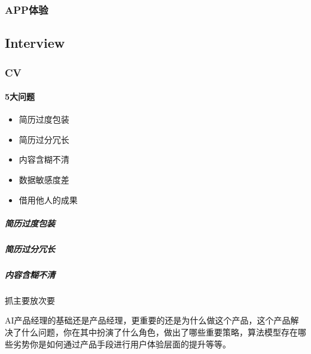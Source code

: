 \documentclass[letterpaper,11pt,english]{sphinxmanual}
\begin{document}
\subsubsection{APP体验}
\label{\detokenize{chapter_project/APP_experience:app}}\label{\detokenize{chapter_project/APP_experience::doc}}

\subsection{Interview}
\label{\detokenize{chapter_interview/index:interview}}\label{\detokenize{chapter_interview/index:chap-interview}}\label{\detokenize{chapter_interview/index::doc}}

\subsubsection{CV}
\label{\detokenize{chapter_interview/CV:cv}}\label{\detokenize{chapter_interview/CV::doc}}
\begin{center}\end{center} 


\paragraph{5大问题}
\label{\detokenize{chapter_interview/CV:id1}}\begin{itemize}
\item {} 
简历过度包装

\item {} 
简历过分冗长

\item {} 
内容含糊不清

\item {} 
数据敏感度差

\item {} 
借用他人的成果

\end{itemize}


\subparagraph{简历过度包装}
\label{\detokenize{chapter_interview/CV:id2}}

\subparagraph{简历过分冗长}
\label{\detokenize{chapter_interview/CV:id3}}

\subparagraph{内容含糊不清}
\label{\detokenize{chapter_interview/CV:id4}}
抓主要放次要

AI产品经理的基础还是产品经理，更重要的还是为什么做这个产品，这个产品解决了什么问题，你在其中扮演了什么角色，做出了哪些重要策略，算法模型存在哪些劣势你是如何通过产品手段进行用户体验层面的提升等等。
\end{document}
